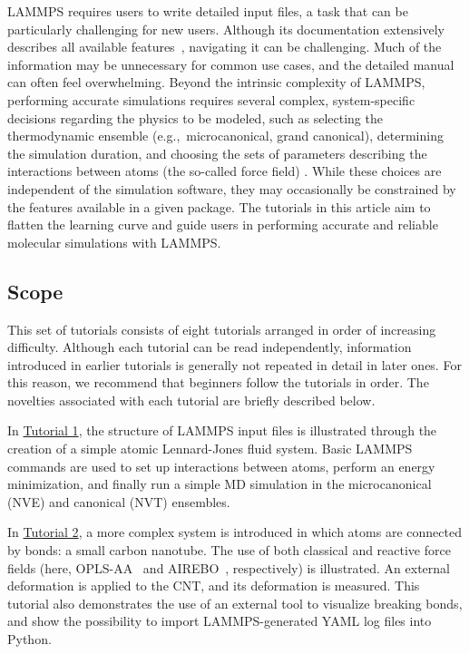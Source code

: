 \documentclass[9pt,tutorial]{livecoms}
\begin{document}
LAMMPS requires users to write detailed input files, a task that can be
particularly challenging for new users.  Although its documentation
extensively describes all available features~\cite{lammps_docs},
navigating it can be challenging.  Much of the information may be
unnecessary for common use cases, and the detailed manual can often feel
overwhelming.  Beyond the intrinsic complexity of LAMMPS, performing
accurate simulations requires several complex, system-specific decisions
regarding the physics to be modeled, such as selecting the thermodynamic
ensemble (e.g.,~microcanonical, grand canonical), determining the
simulation duration, and choosing the sets of parameters describing the
interactions between atoms (the so-called force field)
\cite{wong2016good, van2018validation, prasad2018best}.  While these
choices are independent of the simulation software, they may
occasionally be constrained by the features available in a given
package.  The tutorials in this article aim to flatten the learning
curve and guide users in performing accurate and reliable molecular
simulations with LAMMPS.

\subsection{Scope}

This set of tutorials consists of eight tutorials arranged in order of
increasing difficulty.  Although each tutorial can be
read independently, information introduced in earlier tutorials is
generally not repeated in detail in later ones. For this reason, we
recommend that beginners follow the tutorials in order.  The novelties
associated with each tutorial are briefly described below.

In \hyperref[lennard-jones-label]{Tutorial 1}, the structure of LAMMPS
input files is illustrated through the creation of a simple atomic
Lennard-Jones fluid system.  Basic LAMMPS commands are used to set up
interactions between atoms, perform an energy minimization, and finally
run a simple MD simulation in the microcanonical (NVE) and canonical (NVT)
ensembles.

In \hyperref[carbon-nanotube-label]{Tutorial 2}, a more complex system
is introduced in which atoms are connected by bonds: a small carbon
nanotube.  The use of both classical and reactive force fields (here,
OPLS-AA~\cite{jorgensenDevelopmentTestingOPLS1996} and
AIREBO~\cite{stuart2000reactive}, respectively) is illustrated.  An
external deformation is applied to the CNT, and its deformation is
measured.  This tutorial also demonstrates the use of an external tool
to visualize breaking bonds, and show the possibility to import
LAMMPS-generated YAML log files into Python.
\end{document}
